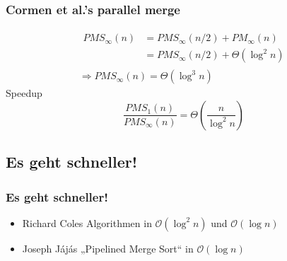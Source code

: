 \begin{frame}
    \frametitle{Cormen et al.'s parallel merge}
    \begin{equation}
        \begin{gathered}
            \begin{split}
                PMS_\infty(n) &= PMS_\infty(n/2) + PM_\infty(n) \\
                &= PMS_\infty(n/2) + \Theta(\log^2 n)
            \end{split}
            \\
            \Rightarrow PMS_\infty(n) = \Theta(\log^3 n)
        \end{gathered}
    \end{equation}
    \pause
    Speedup
    \begin{equation}
        \frac{PMS_1(n)}{PMS_\infty(n)} = \Theta \left( \frac{n}{\log^2 n} \right)
    \end{equation}
\end{frame}

\subsection{Es geht schneller!}
\begin{frame}
    \frametitle{Es geht schneller!}
    \pause
    \begin{itemize}
        \item Richard Coles Algorithmen \cite[Kapitel 10]{reif} in
            $\mathcal{O}(\log^2 n)$ und $\mathcal{O}(\log n)$
        \pause
        \item Joseph J\'aj\'as „Pipelined Merge Sort“ \cite[S.163]{jaja} in
            $\mathcal{O}(\log n)$
    \end{itemize}
\end{frame}
